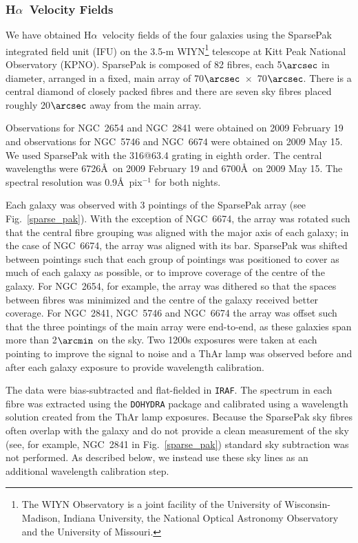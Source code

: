 \documentclass[a4paper,fleqn,usenatbib]{mnras}
\begin{document}
\subsubsection{H$\alpha$\ Velocity Fields}
\label{sec:havfs}

We have obtained H$\alpha$\ velocity fields of the four galaxies using the SparsePak integrated field unit (IFU) \citep{bershady2004} on the 3.5-m WIYN\footnote{The WIYN Observatory is a joint facility of the University of Wisconsin-Madison, Indiana University, the National Optical Astronomy Observatory and the University of Missouri.} telescope at Kitt Peak National Observatory (KPNO).   SparsePak is composed of 82 fibres, each 5$\arcsec$ in diameter, arranged in a fixed, main array of 70$\arcsec$~$\times$~70$\arcsec$. There is a central diamond of closely packed fibres and there are seven sky fibres placed roughly 20$\arcsec$ away from the main array.    

Observations for NGC~2654 and NGC~2841 were obtained on 2009 February 19 and observations for NGC~5746 and NGC~6674 were obtained on 2009 May 15. We used SparsePak with the 316@63.4 grating in eighth order. The central wavelengths were 6726\AA\ on 2009 February 19 and 6700\AA\ on 2009 May 15. The spectral resolution was 0.9\AA\ pix$^{-1}$ for both nights. 

Each galaxy was observed with 3 pointings of the SparsePak array (see Fig.~\ref{sparse_pak}).  With the exception of NGC~6674, the array was rotated such that the central fibre grouping was aligned with the major axis of each galaxy; in the case of NGC~6674, the array was aligned with its bar. SparsePak was shifted between pointings such that each group of pointings was positioned to cover as much of each galaxy as possible, or to improve coverage of the centre of the galaxy. For NGC~2654, for example, the array was dithered so that the spaces between fibres was minimized and the centre of the galaxy received better coverage. For NGC~2841, NGC~5746 and NGC~6674 the array was offset such that the three pointings of the main array were end-to-end, as these galaxies span more than 2$\arcmin$\ on the sky. Two 1200s exposures were taken at each pointing to improve the signal to noise and a ThAr lamp was observed before and after each galaxy exposure to provide wavelength calibration.

The data were bias-subtracted and flat-fielded in \texttt{IRAF}. The spectrum in each fibre was extracted using the \texttt{DOHYDRA} package and calibrated using a wavelength solution created from the ThAr lamp exposures. Because the SparsePak sky fibres often overlap with the galaxy and do not provide a clean measurement of the sky (see, for example, NGC~2841 in Fig.~\ref{sparse_pak})  standard sky subtraction was not performed. As described below, we instead use these sky lines as an additional wavelength calibration step.
\end{document}
